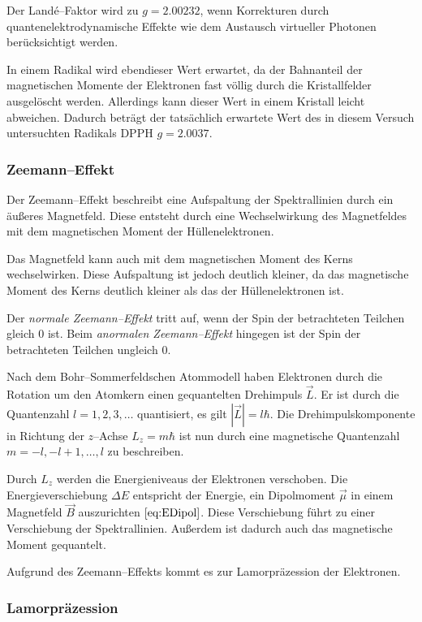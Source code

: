 \documentclass[12pt,a4paper]{scrartcl}
\numberwithin{equation}{section} %
\begin{document}
Der Landé--Faktor wird zu $g = 2.00232$, wenn Korrekturen durch quantenelektrodynamische Effekte wie dem Austausch virtueller Photonen berücksichtigt werden.

In einem Radikal  wird ebendieser Wert erwartet, da der Bahnanteil der magnetischen Momente der Elektronen fast völlig durch die Kristallfelder ausgelöscht werden. Allerdings kann dieser Wert in einem Kristall leicht abweichen. Dadurch beträgt der tatsächlich erwartete Wert des in diesem Versuch untersuchten Radikals $\mathrm{DPPH}$ $g = 2.0037$.

\hypertarget{zeemanneffekt}{\subsubsection{Zeemann--Effekt}\label{zeemanneffekt}}

Der Zeemann--Effekt beschreibt eine Aufspaltung der Spektrallinien durch ein äußeres Magnetfeld. Diese entsteht durch eine Wechselwirkung des Magnetfeldes mit dem magnetischen Moment der Hüllenelektronen.

Das Magnetfeld kann auch mit dem magnetischen Moment des Kerns wechselwirken. Diese Aufspaltung ist jedoch deutlich kleiner, da das magnetische Moment des Kerns deutlich kleiner als das der Hüllenelektronen ist.

Der \emph{normale Zeemann--Effekt} tritt auf, wenn der Spin der betrachteten Teilchen gleich $0$ ist. Beim \emph{anormalen Zeemann--Effekt} hingegen ist der Spin der betrachteten Teilchen ungleich $0$.

Nach dem Bohr--Sommerfeldschen Atommodell haben Elektronen durch die Rotation um den Atomkern einen gequantelten Drehimpuls $\vec{L}$. Er ist durch die Quantenzahl $l=1,2,3,\dots$ quantisiert, es gilt $|\vec{L}| = l\hbar$. Die Drehimpulskomponente in Richtung der $z$--Achse $L_z=m\hbar$ ist nun durch eine magnetische Quantenzahl $m=-l,-l+1,\dots,l$ zu beschreiben.

Durch $L_z$ werden die Energieniveaus der Elektronen verschoben. Die Energieverschiebung $\Delta E$ entspricht der Energie, ein Dipolmoment $\vec \mu$ in einem Magnetfeld $\vec B$ auszurichten $\eqref{eq:EDipol}$. Diese Verschiebung führt zu einer Verschiebung der Spektrallinien. Außerdem ist dadurch auch das magnetische Moment gequantelt.

Aufgrund des Zeemann--Effekts kommt es zur Lamorpräzession der Elektronen.

\hypertarget{lamorpruxe4zession}{%
	\subsubsection{Lamorpräzession}\label{lamorpruxe4zession}}
\end{document}
